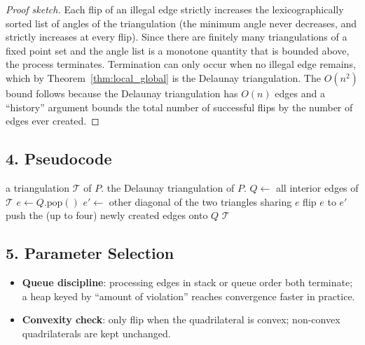 \begin{proof}[Proof sketch]
Each flip of an illegal edge strictly increases the lexicographically sorted
list of angles of the triangulation (the minimum angle never decreases, and
strictly increases at every flip). Since there are finitely many triangulations
of a fixed point set and the angle list is a monotone quantity that is bounded
above, the process terminates. Termination can only occur when no illegal edge
remains, which by Theorem~\ref{thm:local_global} is the Delaunay
triangulation. The $O(n^2)$ bound follows because the Delaunay triangulation
has $O(n)$ edges and a ``history'' argument bounds the total number of
successful flips by the number of edges ever created.
\end{proof}

\subsection{4. Pseudocode}

\begin{algorithm}[htbp]
\caption{Lawson's Flip Algorithm}
\label{alg:flip_to_delaunay}
\begin{algorithmic}[1]
\Require a triangulation $\mathcal{T}$ of $P$.
\Ensure the Delaunay triangulation of $P$.
  \State $Q \gets $ all interior edges of $\mathcal{T}$
    \State $e \gets Q.\text{pop}()$
      \State $e' \gets $ other diagonal of the two triangles sharing $e$
      \State flip $e$ to $e'$
      \State push the (up to four) newly created edges onto $Q$
    \EndIf
  \EndWhile
  \State \Return $\mathcal{T}$
\EndFunction
\end{algorithmic}
\end{algorithm}

\subsection{5. Parameter Selection}

\begin{itemize}
\item \textbf{Queue discipline}: processing edges in stack or queue order both
  terminate; a heap keyed by ``amount of violation'' reaches convergence faster
  in practice.
\item \textbf{Convexity check}: only flip when the quadrilateral is convex;
  non-convex quadrilaterals are kept unchanged.
\end{itemize}

